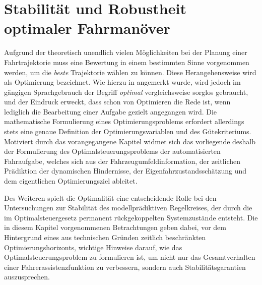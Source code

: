 \chapter{Stabilität und Robustheit optimaler Fahrmanöver}\label{chap:stabilisierung}


Aufgrund der theoretisch unendlich vielen Möglichkeiten bei der Planung einer Fahrtrajektorie muss eine Bewertung in einem bestimmten Sinne vorgenommen werden, um die \emph{beste} Trajektorie wählen zu können. Diese Herangehensweise wird als Optimierung bezeichnet. Wie hierzu in \cite{foellingeroptimal} angemerkt wurde, wird jedoch im gängigen Sprachgebrauch der Begriff \emph{optimal} vergleichsweise sorglos gebraucht, und der Eindruck erweckt, dass schon von Optimieren die Rede ist, wenn lediglich die Bearbeitung einer Aufgabe gezielt angegangen wird. Die mathematische Formulierung eines Optimierungsproblems erfordert allerdings stets eine genaue Definition der Optimierungsvariablen und des Gütekriteriums. Motiviert durch das vorangegangene Kapitel widmet sich das vorliegende deshalb der Formulierung des Optimalsteuerungsproblems der automatisierten Fahraufgabe, welches sich aus der Fahrzeugumfeldinformation, der zeitlichen Prädiktion der dynamischen Hindernisse, der Eigenfahrzustandsschätzung und dem eigentlichen Optimierungsziel ableitet.

Des Weiteren spielt die Optimalität eine entscheidende Rolle bei den Untersuchungen zur Stabilität des modellprädiktiven Regelkreises, der durch die im Optimalsteuergesetz permanent rückgekoppelten Systemzustände entsteht. %
Die in diesem Kapitel vorgenommenen Betrachtungen geben dabei, vor dem Hintergrund eines aus technischen Gründen zeitlich beschränkten Optimierungshorizonts, wichtige Hinweise darauf, wie das Optimalsteuerungsproblem zu formulieren ist, um nicht nur das Gesamtverhalten einer Fahrerassistenzfunktion zu verbessern, sondern auch Stabilitätsgarantien auszusprechen.  


